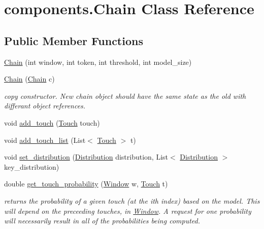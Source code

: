 \hypertarget{classcomponents_1_1_chain}{}\section{components.\+Chain Class Reference}
\label{classcomponents_1_1_chain}
\subsection*{Public Member Functions}
\begin{DoxyCompactItemize}
\item 
\hyperlink{classcomponents_1_1_chain_afd25b8fbf65a81889a812eeb63b9520e}{Chain} (int window, int token, int threshold, int model\+\_\+size)
\item 
\hyperlink{classcomponents_1_1_chain_ac35b83e35e0bd5295eb873e2a5a2f989}{Chain} (\hyperlink{classcomponents_1_1_chain}{Chain} c)
\begin{DoxyCompactList}\small\item\em copy constructor. New chain object should have the same state as the old with differant object references. \end{DoxyCompactList}\item 
void \hyperlink{classcomponents_1_1_chain_a9a8aa7996f3f4b65a0f0dbbddd84f14b}{add\+\_\+touch} (\hyperlink{classcomponents_1_1_touch}{Touch} touch)
\item 
void \hyperlink{classcomponents_1_1_chain_a2eb35304ee80f15c741a986a214e663b}{add\+\_\+touch\+\_\+list} (List$<$ \hyperlink{classcomponents_1_1_touch}{Touch} $>$ t)
\item 
void \hyperlink{classcomponents_1_1_chain_a4184b4a5a7bd8b2412e7543c2db91af1}{set\+\_\+distribution} (\hyperlink{classcomponents_1_1_distribution}{Distribution} distribution, List$<$ \hyperlink{classcomponents_1_1_distribution}{Distribution} $>$ key\+\_\+distribution)
\item 
double \hyperlink{classcomponents_1_1_chain_a96cec1762b6f69856f54aad9e37b04a7}{get\+\_\+touch\+\_\+probability} (\hyperlink{classcomponents_1_1_window}{Window} w, \hyperlink{classcomponents_1_1_touch}{Touch} t)
\begin{DoxyCompactList}\small\item\em returns the probability of a given touch (at the i\textquotesingle{}th index) based on the model. This will depend on the preceeding touches, in \hyperlink{classcomponents_1_1_window}{Window}. A request for one probability will necessarily result in all of the probabilities being computed. \end{DoxyCompactList}\item 

\end{DoxyCompactItemize}
